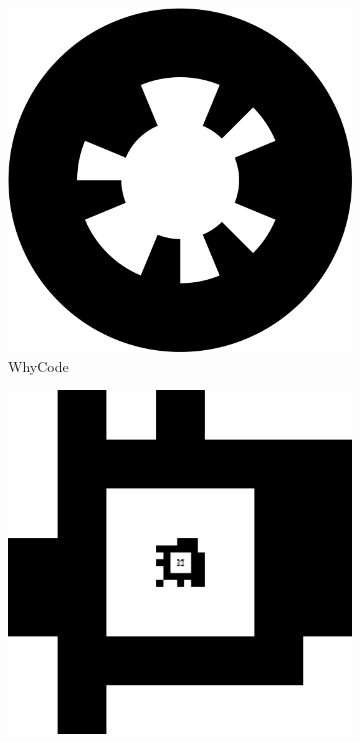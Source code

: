 \begin{figure}[]
    \centering
    \begin{subfigure}[b]{0.2\linewidth}
        \includegraphics[width=\textwidth]{images/whycode_borderless}
        \caption{WhyCode}
        \label{figure:whycode}
    \end{subfigure}
    \begin{subfigure}[b]{0.2\linewidth}
        \includegraphics[width=\textwidth]{images/tagCustom24h10_00002_00001_00000}

\end{subfigure}
\end{figure}
